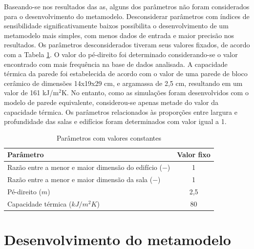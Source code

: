 \documentclass[brazil,hardcopy,openany]{ufscthesis} %
\begin{document}
Baseando-se nos resultados das \acrshort{as}, alguns dos parâmetros não foram considerados para o desenvolvimento do metamodelo. Desconsiderar parâmetros com índices de sensibilidade significativamente baixos possibilita o desenvolvimento de um metamodelo mais simples, com menos dados de entrada e maior precisão nos resultados. Os parâmetros desconsiderados tiveram seus valores fixados, de acordo com a Tabela \ref{table:param_fixed}. O valor do pé-direito foi determinado considerando-se o valor encontrado com mais frequência na base de dados analisada. A capacidade térmica da parede foi estabelecida de acordo com o valor de uma parede de bloco cerâmico de dimensões 14x19x29 cm, e argamassa de 2,5 cm, resultando em um valor de 161 kJ/m$^2$K. No entanto, como as simulações foram desenvolvidos com o modelo de parede equivalente, considerou-se apenas metade do valor da capacidade térmica. Os parâmetros relacionados às proporções entre largura e profundidade das salas e edifícios foram determinados com valor igual a 1. 

\begin{table}[h]		
	\centering
	\caption{Parâmetros com valores constantes}
	\label{table:param_fixed}
	\begin{tabular}{|l |c |}
		\hline
		\textbf{Parâmetro} & Valor fixo \\
		\hline
		Razão entre a menor e maior dimensão do edifício ($-$) & 1 \\
		\hline
		Razão entre a menor e maior dimensão da sala ($-$) & 1 \\
		\hline
		Pé-direito ($m$) & 2,5 \\
		\hline
		Capacidade térmica ($kJ/m^2K$) & 80 \\
		\hline
	\end{tabular}
\end{table}

\newpage

\section{Desenvolvimento do metamodelo}
 
\end{document}
